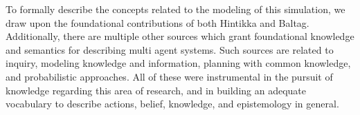 To formally describe the concepts related to the modeling of this simulation,
we draw upon the foundational contributions of both Hintikka\cite{hintikka} and
Baltag\cite{Baltag}. Additionally, there are multiple other sources which grant
foundational knowledge and semantics for describing multi agent systems. Such
sources are related to inquiry\cite{delimi}, modeling knowledge and
information\cite{modelling_multi_agent_epistemic_systems}, planning with common
knowledge\cite{multi_agent_epistemic_planner_common_knowledge}, and
probabilistic approaches\cite{probibalistic_multiagent_systems}. All of these
were instrumental in the pursuit of knowledge regarding this area of research,
and in building an adequate vocabulary to describe actions, belief, knowledge,
and epistemology in general.